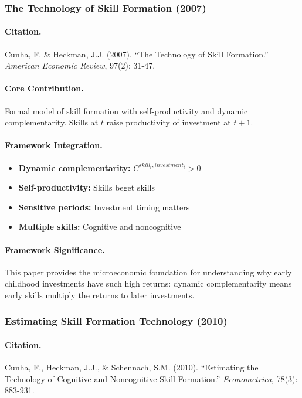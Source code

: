 \subsubsection{The Technology of Skill Formation (2007)}

\paragraph{Citation.}
Cunha, F. \& Heckman, J.J. (2007). ``The Technology of Skill Formation.''
\emph{American Economic Review}, 97(2): 31-47.

\paragraph{Core Contribution.}
Formal model of skill formation with self-productivity and dynamic
complementarity. Skills at $t$ raise productivity of investment at $t+1$.

\paragraph{Framework Integration.}
\begin{itemize}
  \item \textbf{Dynamic complementarity:} $C^{skill_t, investment_t} > 0$
  \item \textbf{Self-productivity:} Skills beget skills
  \item \textbf{Sensitive periods:} Investment timing matters
  \item \textbf{Multiple skills:} Cognitive and noncognitive
\end{itemize}

\paragraph{Framework Significance.}
This paper provides the microeconomic foundation for understanding why
early childhood investments have such high returns: dynamic complementarity
means early skills multiply the returns to later investments.

\subsubsection{Estimating Skill Formation Technology (2010)}

\paragraph{Citation.}
Cunha, F., Heckman, J.J., \& Schennach, S.M. (2010). ``Estimating the
Technology of Cognitive and Noncognitive Skill Formation.''
\emph{Econometrica}, 78(3): 883-931.

